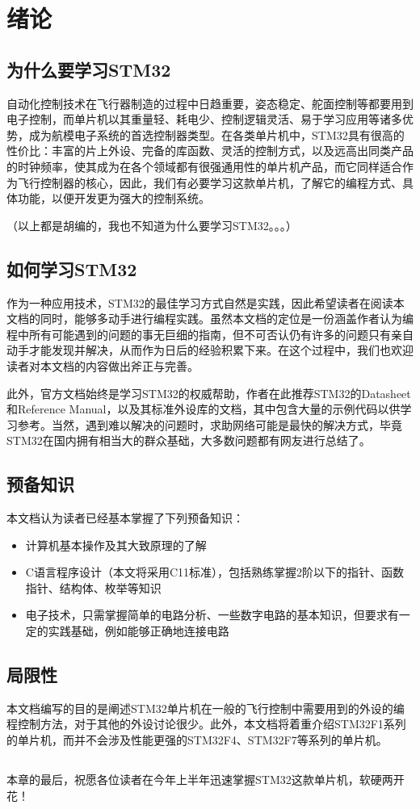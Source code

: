 \chapter{绪论}

\section{为什么要学习STM32}
自动化控制技术在飞行器制造的过程中日趋重要，姿态稳定、舵面控制等都要用到电子控制，而单片机以其重量轻、耗电少、控制逻辑灵活、易于学习应用等诸多优势，成为航模电子系统的首选控制器类型。在各类单片机中，STM32具有很高的性价比：丰富的片上外设、完备的库函数、灵活的控制方式，以及远高出同类产品的时钟频率，使其成为在各个领域都有很强通用性的单片机产品，而它同样适合作为飞行控制器的核心，因此，我们有必要学习这款单片机，了解它的编程方式、具体功能，以便开发更为强大的控制系统。
\par 
（以上都是胡编的，我也不知道为什么要学习STM32。。。）

\section{如何学习STM32}

作为一种应用技术，STM32的最佳学习方式自然是实践，因此希望读者在阅读本文档的同时，能够多动手进行编程实践。虽然本文档的定位是一份涵盖作者认为编程中所有可能遇到的问题的事无巨细的指南，但不可否认仍有许多的问题只有亲自动手才能发现并解决，从而作为日后的经验积累下来。在这个过程中，我们也欢迎读者对本文档的内容做出斧正与完善。

\par 
此外，官方文档始终是学习STM32的权威帮助，作者在此推荐STM32的Datasheet和Reference Manual，以及其标准外设库的文档，其中包含大量的示例代码以供学习参考。当然，遇到难以解决的问题时，求助网络可能是最快的解决方式，毕竟STM32在国内拥有相当大的群众基础，大多数问题都有网友进行总结了。

\section{预备知识}

本文档认为读者已经基本掌握了下列预备知识：
\begin{itemize}
	\item 计算机基本操作及其大致原理的了解
	\item C语言程序设计（本文将采用C11标准），包括熟练掌握2阶以下的指针、函数指针、结构体、枚举等知识
	\item 电子技术，只需掌握简单的电路分析、一些数字电路的基本知识，但要求有一定的实践基础，例如能够正确地连接电路
\end{itemize}

\section{局限性}
本文档编写的目的是阐述STM32单片机在一般的飞行控制中需要用到的外设的编程控制方法，对于其他的外设讨论很少。此外，本文档将着重介绍STM32F1系列的单片机，而并不会涉及性能更强的STM32F4、STM32F7等系列的单片机。

\section*{}
本章的最后，祝愿各位读者在今年上半年迅速掌握STM32这款单片机，软硬两开花！
